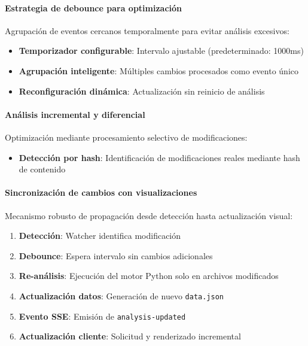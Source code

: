 \documentclass[a4paper, 12pt]{book}
\begin{document}
\paragraph{Estrategia de debounce para optimización}
Agrupación de eventos cercanos temporalmente para evitar análisis excesivos:

\begin{itemize}
  \item \textbf{Temporizador configurable}: Intervalo ajustable (predeterminado: 1000ms)
  \item \textbf{Agrupación inteligente}: Múltiples cambios procesados como evento único
  \item \textbf{Reconfiguración dinámica}: Actualización sin reinicio de análisis
\end{itemize}

\paragraph{Análisis incremental y diferencial}
Optimización mediante procesamiento selectivo de modificaciones:

\begin{itemize}
  \item \textbf{Detección por hash}: Identificación de modificaciones reales mediante hash de contenido
\end{itemize}

\paragraph{Sincronización de cambios con visualizaciones}
Mecanismo robusto de propagación desde detección hasta actualización visual:

\begin{enumerate}
  \item \textbf{Detección}: Watcher identifica modificación
  \item \textbf{Debounce}: Espera intervalo sin cambios adicionales
  \item \textbf{Re-análisis}: Ejecución del motor Python solo en archivos modificados
  \item \textbf{Actualización datos}: Generación de nuevo \texttt{data.json}
  \item \textbf{Evento SSE}: Emisión de \texttt{analysis-updated}
  \item \textbf{Actualización cliente}: Solicitud y renderizado incremental
\end{enumerate}
\end{document}
